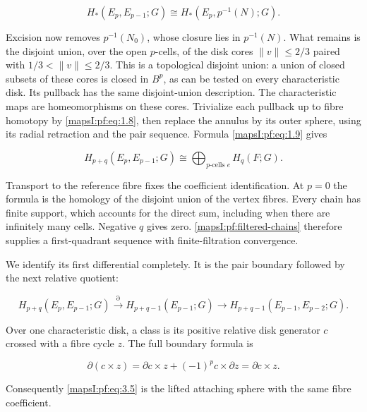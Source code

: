 \begin{equation}
H_*(E_p,E_{p-1};G)\cong H_*(E_p,p^{-1}(N);G).
\label{mapsI:pf:eq:3.3}
\end{equation}

Excision now removes \(p^{-1}(N_0)\), whose closure lies in \(p^{-1}(N)\). What remains is the disjoint union, over the open \(p\)-cells, of the disk cores \(\|v\|\leq2/3\) paired with \(1/3<\|v\|\leq2/3\). This is a topological disjoint union: a union of closed subsets of these cores is closed in \(B^p\), as can be tested on every characteristic disk. Its pullback has the same disjoint-union description. The characteristic maps are homeomorphisms on these cores. Trivialize each pullback up to fibre homotopy by \eqref{mapsI:pf:eq:1.8}, then replace the annulus by its outer sphere, using its radial retraction and the pair sequence. Formula \eqref{mapsI:pf:eq:1.9} gives

\begin{equation}
H_{p+q}(E_p,E_{p-1};G)
\cong\bigoplus_{\text{\(p\)-cells }e}H_q(F;G).
\label{mapsI:pf:eq:3.4}
\end{equation}

Transport to the reference fibre fixes the coefficient identification. At \(p=0\) the formula is the homology of the disjoint union of the vertex fibres. Every chain has finite support, which accounts for the direct sum, including when there are infinitely many cells. Negative \(q\) gives zero. \cref{mapsI:pf:filtered-chains} therefore supplies a first-quadrant sequence with finite-filtration convergence.

We identify its first differential completely. It is the pair boundary followed by the next relative quotient:

\begin{equation}
H_{p+q}(E_p,E_{p-1};G)\xrightarrow{\partial}
H_{p+q-1}(E_{p-1};G)\longrightarrow
H_{p+q-1}(E_{p-1},E_{p-2};G).
\label{mapsI:pf:eq:3.5}
\end{equation}

Over one characteristic disk, a class is its positive relative disk generator \(c\) crossed with a fibre cycle \(z\). The full boundary formula is

\begin{equation}
\partial(c\times z)=\partial c\times z+(-1)^p c\times\partial z
=\partial c\times z.
\label{mapsI:pf:eq:3.6}
\end{equation}

Consequently \eqref{mapsI:pf:eq:3.5} is the lifted attaching sphere with the same fibre coefficient.

